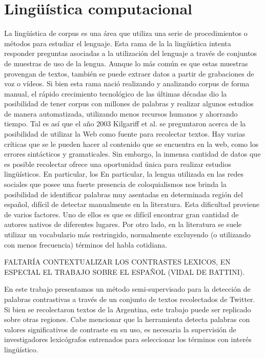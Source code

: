 

\section{Lingüística computacional} %
\label{linguistica_computacional}

La lingüística de corpus es una área que utiliza una serie de procedimientos o métodos para estudiar el lenguaje. Esta rama de la la lingüística intenta responder 
preguntas asociadas a la utilización del lenguaje a través de conjuntos de muestras de uso de la lengua. Aunque lo más común es que estas muestras provengan de textos, también se puede extraer datos a partir de grabaciones de voz o vídeos. Si bien esta rama nació realizando y analizando corpus de forma manual, el rápido crecimiento
tecnológico de las últimas décadas dio la posibilidad de tener corpus con millones de palabras y realizar algunos estudios de manera automatizada, utilizando menos recursos humanos y ahorrando tiempo. 
Tal es así que el año 2003 Kilgariff et al. \cite{kilgarriff2003introduction} se preguntaron acerca de la posibilidad de utilizar la Web como fuente para recolectar textos. Hay varias críticas que se le pueden hacer al contenido que se encuentra en la web, como los errores sintácticos y  gramaticales. Sin embargo, la inmensa cantidad de datos que es posible recolectar ofrece una oportunidad única para realizar estudios lingüísticos. En particular, los  En particular, la lengua utilizada en las redes sociales que posee una fuerte presencia de coloquialismos nos brinda la posibilidad de identificar palabras muy asentadas en determinada región del español, difícil de detectar manualmente en la literatura. Esta dificultad proviene de varios factores. Uno de ellos es que es difícil encontrar gran cantidad de autores nativos de diferentes lugares. Por otro lado, en la literatura se suele utilizar un vocabulario más restringido, normalmente excluyendo (o utilizando con menos frecuencia) términos del habla cotidiana. 


FALTARÍA CONTEXTUALIZAR LOS CONTRASTES LEXICOS, EN ESPECIAL EL TRABAJO SOBRE EL ESPAÑOL (VIDAL DE BATTINI).

\cite{baayen2001word}
\cite{mcenery2011corpus}


En este trabajo presentamos un método semi-supervisado para la detección de palabras contrastivas a través de un conjunto de textos recolectados de Twitter. Si bien se recolectaron textos de la Argentina, este trabajo puede ser replicado sobre otras regiones. Cabe mencionar que la herramienta detecta palabras con valores significativos de contraste en su uso, es necesaria la supervisión de investigadores lexicógrafos entrenados para seleccionar los términos con interés lingüístico.

